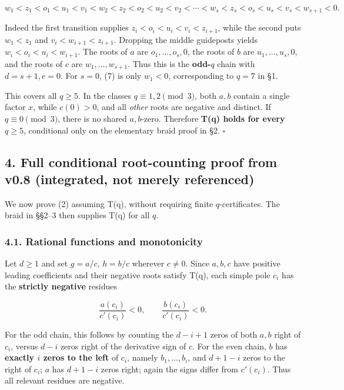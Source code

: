 \documentclass[
  10pt,
]{article}
\begin{document}
\[
 w_1<z_1<o_1<u_1<v_1<w_2<z_2<o_2<u_2<v_2<\cdots<w_{s}<z_s<o_s<u_s<v_s<w_{s+1}<0.
 \tag{7}
\]

Indeed the first transition supplies \(z_i<o_i<u_i<v_i<z_{i+1}\), while
the second puts \(w_1<z_1\) and \(v_i<w_{i+1}<z_{i+1}\). Dropping the
middle guideposts yields \(w_i<o_i<u_i<w_{i+1}\). The roots of \(a\) are
\(o_1,\ldots,o_s,0\), the roots of \(b\) are \(u_1,\ldots,u_s,0\), and
the roots of \(c\) are \(w_1,\ldots,w_{s+1}\). Thus this is the
\textbf{odd-\(q\)} chain with \(d=s+1,e=0\). For \(s=0\), (7) is only
\(w_1<0\), corresponding to \(q=7\) in §1.

This covers all \(q\ge5\). In the classes \(q\equiv1,2\pmod3\), both
\(a,b\) contain a single factor \(x\), while \(c(0)>0\), and all
\emph{other} roots are negative and distinct. If \(q\equiv0\pmod3\),
there is no shared \(a,b\)-zero. Therefore \textbf{T(q) holds for every
\(q\ge5\)}, conditional only on the elementary braid proof in §2.
\(\square\)

\subsection{4. Full conditional root-counting proof from v0.8
(integrated, not merely
referenced)}\label{full-conditional-root-counting-proof-from-v0.8-integrated-not-merely-referenced}

We now prove (2) assuming T(q), without requiring finite
\(q\)-certificates. The braid in §§2--3 then supplies T(q) for all
\(q\).

\subsubsection{4.1. Rational functions and
monotonicity}\label{rational-functions-and-monotonicity}

Let \(d\ge1\) and set \(g=a/c\), \(h=b/c\) wherever \(c\ne0\). Since
\(a,b,c\) have positive leading coefficients and their negative roots
satisfy T(q), each simple pole \(c_i\) has the \textbf{strictly
negative} residues

\[
 \frac{a(c_i)}{c'(c_i)}<0,\qquad \frac{b(c_i)}{c'(c_i)}<0.
 \tag{8}
\]

For the odd chain, this follows by counting the \(d-i+1\) zeros of both
\(a,b\) right of \(c_i\), versus \(d-i\) zeros right of the derivative
sign of \(c\). For the even chain, \(b\) has \textbf{exactly \(i\) zeros
to the left} of \(c_i\), namely \(b_1,\ldots,b_i\), and \(d+1-i\) zeros
to the right of \(c_i\); \(a\) has \(d+1-i\) zeros right; again the
signs differ from \(c'(c_i)\). Thus all relevant residues are negative.
\end{document}
